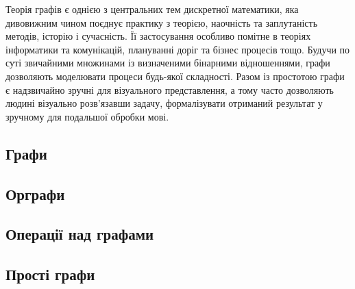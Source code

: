 Теорія графів є однією з центральних тем дискретної математики, яка дивовижним чином поєднує практику з теорією, наочність та заплутаність методів, історію і сучасність. Її застосування особливо помітне в теоріях інформатики та комунікацій, плануванні доріг та бізнес процесів тощо. Будучи по суті звичайними множинами із визначеними бінарними відношеннями, графи дозволяють моделювати процеси будь-якої складності. Разом із простотою графи є надзвичайно зручні для візуального представлення, а тому часто дозволяють людині візуально розв'язавши задачу, формалізувати отриманий результат у зручному для подальшої обробки мові.


\newpage
\subsection{Графи}


\newpage
\subsection{Орграфи}


\newpage
\subsection{Операції над графами}


\newpage
\subsection{Прості графи}

